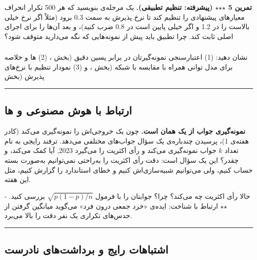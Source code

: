 \textbf{تمرین 5 \ensuremath{\star}\ensuremath{\star}\ensuremath{\star} (پیشرفته: تنظیم تطبیقی).} یک مرحله‌ی 
بنویسید که هر 500 تکرار انحراف معیارهای پیشنهادی را تنظیم کند تا نرخ
پذیرش به سمت 0.3 برود (مثلاً اگر نرخ خیلی بالاست  را در 1.2 و اگر
خیلی پایین است در 0.8 ضرب کنید)، و بعد آن‌ها را برای اجرای اصلی ثابت کند.
چرا تطبیق باید پیش از نمونه‌هایی که نگه می‌دارید متوقف شود؟

\subsubsection{\texorpdfstring{}{lab check-off}}

نشان دهید: (1) اعتبارسنجی نمونه‌گیرتان در برابر پسین دقیق  (بخش
، (2) ها و خلاصه برای مدل توانی همراه با مقایسه با
شبکه (بخش ، و (3) نمودار تنظیم با نرخ‌های پذیرش (بخش 

\begin{center}\rule{0.5\linewidth}{0.5pt}\end{center}

\subsection{\texorpdfstring{ارتباط با هوش مصنوعی و
ها}{ارتباط با هوش مصنوعی و LLMها}}

\textbf{نمونه‌گیری جواب از یک  همان  است.} چون یک
 خروجی‌اش را نمونه‌گیری می‌کند (کادر هفته‌ی 1)، پرسیدن چندباره‌ی یک
سؤال جواب‌های مختلفی می‌دهد. ترفند رایجی به نام
\textbf{} تعداد \(k\) جواب نمونه‌گیری می‌کند و رأی
اکثریت را می‌گیرد \lr{{[}Wang et al.,} 2023, \lr{ICLR{]}.} آیا کمک می‌کند،
و چقدر؟ این یک سؤال  است: دقت رأی اکثریت را به‌راحتی
نمی‌توانیم به‌صورت بسته حساب کنیم، ولی می‌توانیم شبیه‌سازی‌اش کنیم و خطای
استاندارد  را گزارش کنیم، مثل  این هفته.

حالا رأی اکثریت چه می‌کند؟ چرا؟ جوابتان را با فرمول \(\sqrt{p(1-p)/n}\)
بررسی کنید. - \ensuremath{\star}\ensuremath{\star} ارتباط با شناخت: ایده‌ی «خرد جمعی درون فرد»  می‌گوید میانگین گرفتن از حدس‌های تکراری یک نفر دقت
را بالا می‌برد.

\begin{center}\rule{0.5\linewidth}{0.5pt}\end{center}

\subsection{اشتباهات رایج و برداشت‌های نادرست}

